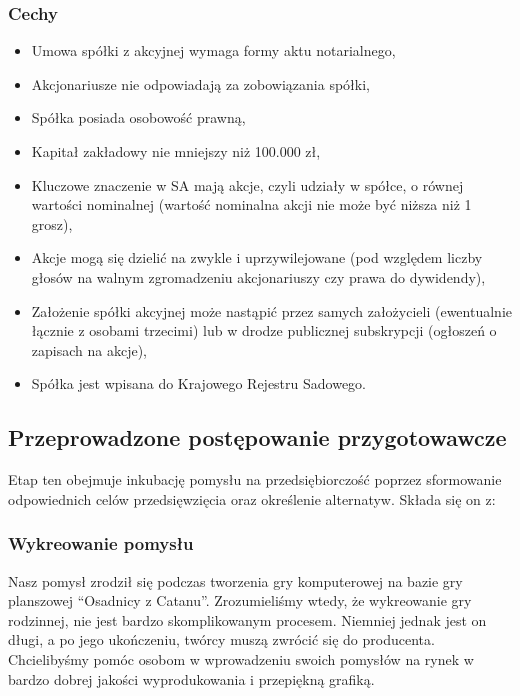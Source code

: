 \documentclass[a4paper, 11pt]{article}
\begin{document}
 \subsubsection{Cechy}%
\begin{itemize}
\item Umowa spółki z akcyjnej wymaga formy aktu notarialnego,
\item Akcjonariusze nie odpowiadają za zobowiązania spółki,
\item Spółka posiada osobowość prawną,
\item Kapitał zakładowy nie mniejszy niż 100.000 zł,
\item Kluczowe znaczenie w SA mają akcje, czyli udziały w spółce, o równej wartości nominalnej (wartość nominalna akcji nie może być niższa niż 1 grosz),
\item Akcje mogą się dzielić na zwykle i uprzywilejowane (pod względem liczby głosów na walnym zgromadzeniu akcjonariuszy czy prawa do dywidendy),
\item Założenie spółki akcyjnej może nastąpić przez samych założycieli (ewentualnie łącznie z osobami trzecimi) lub w drodze publicznej subskrypcji (ogłoszeń o zapisach na akcje),
\item Spółka jest wpisana do Krajowego Rejestru Sadowego.
\end{itemize}








	\subsection{Przeprowadzone postępowanie przygotowawcze}
	\indent
	

	Etap ten obejmuje inkubację pomysłu na przedsiębiorczość poprzez sformowanie odpowiednich celów przedsięwzięcia oraz określenie alternatyw. Składa się on z:

	\subsubsection{Wykreowanie pomysłu}
	\indent
	
	Nasz pomysł zrodził się podczas tworzenia gry komputerowej na bazie gry planszowej “Osadnicy z Catanu”. Zrozumieliśmy wtedy, że wykreowanie gry rodzinnej, nie jest bardzo skomplikowanym procesem. Niemniej jednak jest on długi, a po jego ukończeniu, twórcy muszą zwrócić się do producenta. Chcielibyśmy pomóc osobom w wprowadzeniu swoich pomysłów na rynek w bardzo dobrej jakości wyprodukowania i przepiękną grafiką.
\end{document}

